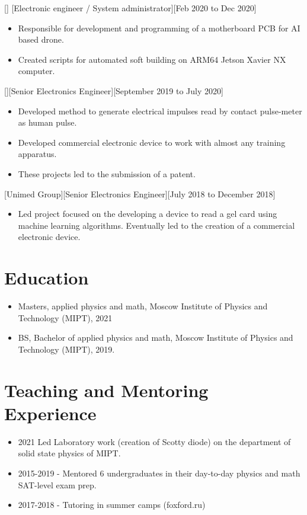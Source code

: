 \documentclass{article}
\begin{document}
[]
[Electronic engineer / System administrator][Feb 2020 to Dec 2020]
 
\begin{itemize}
\item Responsible for development and programming of a motherboard PCB for AI based drone.
\item Created scripts for automated soft building on ARM64 Jetson Xavier NX computer.
\end{itemize}
 
 
[][Senior Electronics Engineer][September 2019 to July 2020]
 
\begin{itemize}
\item Developed method to generate electrical impulses read by contact pulse-meter as human pulse.
\item Developed commercial electronic device to work with almost any training apparatus.
\item These projects led to the submission of a patent.
\end{itemize}
 
[Unimed Group][Senior Electronics Engineer][July 2018 to December 2018]
 
\begin{itemize}
\item Led project focused on the developing a device to read a gel card using machine learning algorithms. Eventually led to the creation of a commercial electronic device.
\end{itemize}
 
 
\section{Education}
 
\begin{itemize}
\item Masters, applied physics and math, Moscow Institute of Physics and Technology (MIPT), 2021
\item BS, Bachelor of applied physics and math, Moscow Institute of Physics and Technology (MIPT), 2019.
\end{itemize}
 
\section{Teaching and Mentoring Experience }
\begin{itemize}
\item 2021 Led Laboratory work (creation of Scotty diode) on the department of solid state physics of MIPT. 
\item 2015-2019 - Mentored 6 undergraduates in their day-to-day physics and math SAT-level exam prep.
\item 2017-2018 - Tutoring in summer camps (foxford.ru)
\end{itemize}
 
\end{document}

